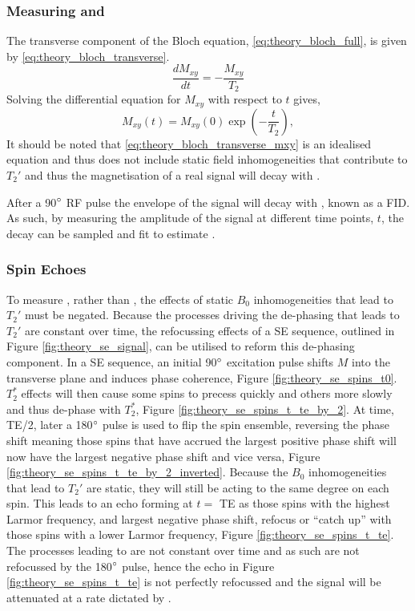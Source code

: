 \subsubsection{Measuring \ttwo and \ttwostar}
The transverse component of the Bloch equation, \eqref{eq:theory_bloch_full}, is given by \eqref{eq:theory_bloch_transverse}.
\begin{equation}
\frac{dM_{xy}}{dt} = - \frac{M_{xy}}{T_2}
\label{eq:theory_bloch_transverse}
\end{equation}
Solving the differential equation for $M_{xy}$ with respect to $t$ gives,
\begin{equation}
M_{xy}\left(t\right) = M_{xy}\left(0\right)\exp\left(-\frac{t}{T_2}\right),
\label{eq:theory_bloch_transverse_mxy}
\end{equation}
It should be noted that \eqref{eq:theory_bloch_transverse_mxy} is an idealised equation and thus does not include static field inhomogeneities that contribute to $T_2'$ and thus the magnetisation of a real signal will decay with \ttwostar.

After a 90$\degree$ \ac{RF} pulse the envelope of the signal will decay with \ttwostar, known as a \ac{FID}. As such, by measuring the amplitude of the signal at different time points, $t$, the decay can be sampled and fit to estimate \ttwostar.

\subsubsection{Spin Echoes}
To measure \ttwo, rather than \ttwostar, the effects of static $B_0$ inhomogeneities that lead to $T_2'$ must be negated. Because the processes driving the de-phasing that leads to $T_2'$ are constant over time, the refocussing effects of a \ac{SE} sequence, outlined in Figure \ref{fig:theory_se_signal}, can be utilised to reform this de-phasing component. In a \ac{SE} sequence, an initial 90$\degree$ excitation pulse shifts $M$ into the transverse plane and induces phase coherence, Figure \ref{fig:theory_se_spins_t0}. $T_2^*$ effects will then cause some spins to precess quickly and others more slowly and thus de-phase with $T_2^*$, Figure \ref{fig:theory_se_spins_t_te_by_2}. At time, \ac{TE}/2, later a 180$\degree$ pulse is used to flip the spin ensemble, reversing the phase shift meaning those spins that have accrued the largest positive phase shift will now have the largest negative phase shift and vice versa, Figure \ref{fig:theory_se_spins_t_te_by_2_inverted}. Because the $B_0$ inhomogeneities that lead to $T_2'$ are static, they will still be acting to the same degree on each spin. This leads to an echo forming at $t =$ \ac{TE} as those spins with the highest Larmor frequency, and largest negative phase shift, refocus or ``catch up'' with those spins with a lower Larmor frequency, Figure \ref{fig:theory_se_spins_t_te}. The processes leading to \ttwo are not constant over time and as such are not refocussed by the 180$\degree$ pulse, hence the echo in Figure \ref{fig:theory_se_spins_t_te} is not perfectly refocussed and the signal will be attenuated at a rate dictated by \ttwo.

